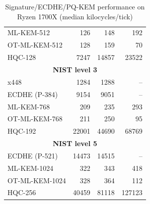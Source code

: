 \documentclass[letterpaper,12pt,titlepage,oneside,final]{book}
\begin{document}
\begin{table}[ht]
\begin{tabular}[t]{lrrr}
        ML-KEM-512 & 126 & 148 & 192 \\
        OT-ML-KEM-512 & 128 & 159 & 70 \\
        HQC-128 & 7247 & 14857 & 23522 \\
    \midrule
        \multicolumn{4}{c}{\bf NIST level 3} \\
    \midrule
        x448 & 1284 & 1288 & -- \\
        ECDHE (P-384) & 9154 & 9051 & -- \\
        ML-KEM-768 & 209 & 235 & 293 \\
        OT-ML-KEM-768 & 211 & 250 & 95 \\
        HQC-192 & 22001 & 44690 & 68769 \\
    \midrule
        \multicolumn{4}{c}{\bf NIST level 5} \\
    \midrule
        ECDHE (P-521) & 14473 & 14515 & -- \\
        ML-KEM-1024 & 322 & 343 & 418 \\
        OT-ML-KEM-1024 & 328 & 364 & 112 \\
        HQC-256 & 40459 & 81118 & 127123 \\
    \bottomrule
    \end{tabular}
    \caption{Signature/ECDHE/PQ-KEM performance on Ryzen 1700X (median kilocycles/tick)}
    \label{tab:crypto-x86-64}
\end{table}
\end{document}
